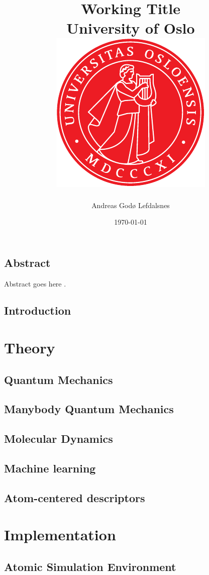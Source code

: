 \documentclass[12pt]{report}
\title{
{Working Title}\\
{\Large University of Oslo}\\
{\includegraphics{uio.pdf}}
}
\author{Andreas Godø Lefdalsnes}
\date{\today}
\begin{document}
\maketitle

\chapter*{Abstract}
Abstract goes here \parencite[e.g.][page 300]{einstein}.
 
\tableofcontents

\chapter{Introduction}


\part{Theory}
 
\chapter{Quantum Mechanics}


\chapter{Manybody Quantum Mechanics}

 
\chapter{Molecular Dynamics}

 
\chapter{Machine learning}


\chapter{Atom-centered descriptors}


\part{Implementation}
\chapter{Atomic Simulation Environment}

\end{document}
